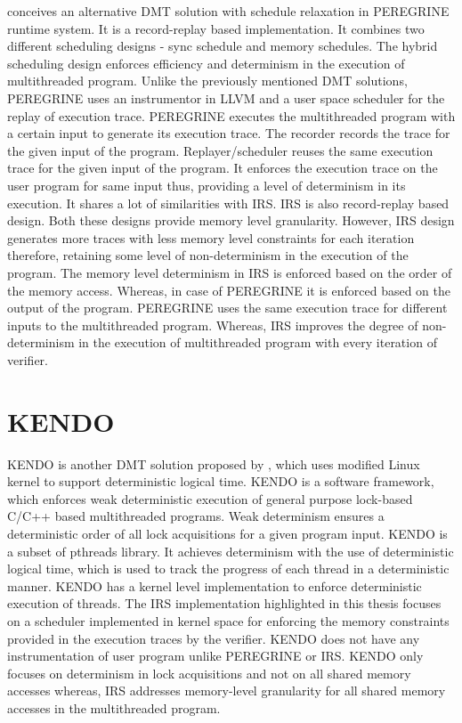 \citet{peregrine} conceives an alternative DMT solution with schedule relaxation in PEREGRINE runtime system. 
It is a record-replay based implementation. 
It combines two different scheduling designs - sync schedule and memory schedules. 
The hybrid scheduling design enforces efficiency and determinism in the execution of multithreaded program. 
Unlike the previously mentioned DMT solutions, PEREGRINE uses an instrumentor in LLVM and a user space scheduler for the replay of execution trace. 
PEREGRINE executes the multithreaded program with a certain input to generate its execution trace. 
The recorder records the trace for the given input of the program. 
Replayer/scheduler reuses the same execution trace for the given input of the program. 
It enforces the execution trace on the user program for same input thus, providing a level of determinism in its execution. 
It shares a lot of similarities with IRS. 
IRS is also record-replay based design. 
Both these designs provide memory level granularity. 
However, IRS design generates more traces with less memory level constraints for each iteration therefore, retaining some level of non-determinism in the execution of the program. 
The memory level determinism in IRS is enforced based on the order of the memory access. 
Whereas, in case of PEREGRINE it is enforced based on the output of the program. 
PEREGRINE uses the same execution trace for different inputs to the multithreaded program. 
Whereas, IRS improves the degree of non-determinism in the execution of multithreaded program with every iteration of verifier.

\section{KENDO}

KENDO is another DMT solution proposed by \citet{kendo}, which uses modified Linux kernel to support deterministic logical time. 
KENDO is a software framework, which enforces weak deterministic execution of general purpose lock-based C/C++ based multithreaded programs.  
Weak determinism ensures a deterministic order of all lock acquisitions for a given program input.   
KENDO is a subset of pthreads library. 
It achieves determinism with the use of deterministic logical time, which is used to track the progress of each thread in a deterministic manner. 
KENDO has a kernel level implementation to enforce deterministic execution of threads. 
The IRS implementation highlighted in this thesis focuses on a scheduler implemented in kernel space for enforcing the memory constraints provided in the execution traces by the verifier. 
KENDO does not have any instrumentation of user program unlike PEREGRINE or IRS. 
KENDO only focuses on determinism in lock acquisitions and not on all shared memory accesses whereas, IRS addresses memory-level granularity for all shared memory accesses in the multithreaded program.

